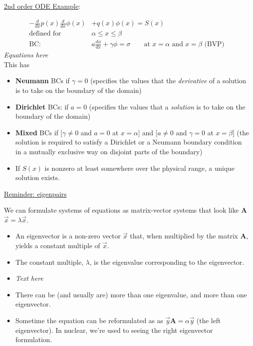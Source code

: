 \documentclass[12pt, answers]{exam}
\newcommand{\ve}[1]{\ensuremath{\mathbf{#1}}}
\begin{document}
\vspace*{1em}
\underline{2nd order ODE Example}:

\ifprintanswers
\begin{align}
-\frac{d}{dx}p(x) \frac{d}{dx}\phi(x) &+ q(x)\phi(x) = S(x) \nonumber \\
\text{defined for }& \alpha \le x \le \beta \nonumber \\
\text{BC: }& a\frac{d\phi}{dx} + \gamma \phi = \sigma \qquad \text{at } x=\alpha \text{ and } x = \beta \text{ (BVP)}\nonumber
\end{align}
\else
 \hspace*{8em}\textit{Equations here}\\
\fi
%
This has
\begin{itemize}
\item \textbf{Neumann} BCs if $\gamma = 0$ (specifies the values that the \textit{derivative} of a solution is to take on the boundary of the domain)
\item \textbf{Dirichlet} BCs: if $a=0$ (specifies the values that a \textit{solution} is to take on the boundary of the domain)
\item \textbf{Mixed} BCs if [$\gamma \ne 0$ and $a = 0$ at $x = \alpha$] and [$a \ne 0$ and $\gamma = 0$ at $x = \beta$] (the solution is required to satisfy a Dirichlet or a Neumann boundary condition in a mutually exclusive way on disjoint parts of the boundary)
\item If $S(x)$ is nonzero at least somewhere over the physical range, a unique solution exists.
\end{itemize}

\vspace*{1 em} \underline{Reminder: eigenpairs}

We can formulate systems of equations as matrix-vector systems that look like \ve{A}$\vec{x} = \lambda \vec{x}$. 
\begin{itemize}
\item An eigenvector is a non-zero vector $\vec{x}$ that, when multiplied by the matrix \ve{A}, yields a constant multiple of $\vec{x}$. 
\ifprintanswers
\item The constant multiple, $\lambda$, is the eigenvalue corresponding to the eigenvector.
\else
 \item \textit{Text here}
\fi
\item There can be (and usually are) more than one eigenvalue, and more than one eigenvector. 
\item Sometime the equation can be reformulated as as $\vec{y}\ve{A} = \alpha \vec{y}$ (the left eigenvector). In nuclear, we're used to seeing the right eigenvector formulation.
\end{itemize}
\end{document}
